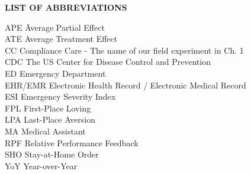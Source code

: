 {}

\begin{center}
{\normalfont \textbf{LIST OF ABBREVIATIONS}}
\end{center}

\newcommand{\Ab}[2]{\noindent  #1 \> #2 \\}
\newcommand{\Abi}[2]{\noindent #1 \hspace{1.5cm} \= #2 \\}

\begin{tabbing}
\Abi{APE}{Average Partial Effect}
\Ab{ATE}{Average Treatment Effect}
\Ab{CC}{Compliance Care - The name of our field experiment in Ch. 1}
\Ab{CDC}{The US Center for Disease Control and Prevention}
\Ab{ED}{Emergency Department}
\Ab{EHR/EMR}{Electronic Health Record / Electronic Medical Record}
\Ab{ESI}{Emergency Severity Index}
\Ab{FPL}{First-Place Loving}
\Ab{LPA}{Last-Place Aversion}
\Ab{MA}{Medical Assistant}
\Ab{RPF}{Relative Performance Feedback}
\Ab{SHO}{Stay-at-Home Order}
\Ab{YoY}{Year-over-Year}
\end{tabbing}

\clearpage
